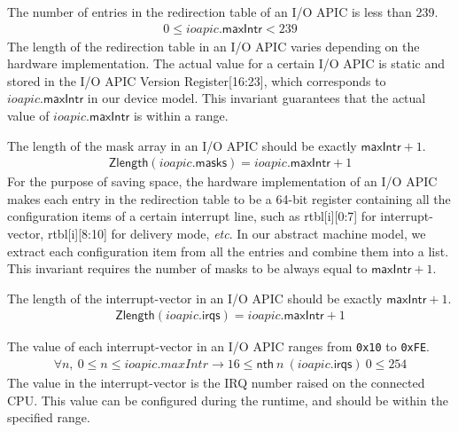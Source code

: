 \begin{invariant}
The number of entries in the redirection table of an I/O APIC is less than 239.
\begin{align*}
0 \leq ioapic.\textsf{maxIntr} < 239
\end{align*}
\noindent{}\textnormal{The length of the redirection table in an I/O APIC varies
	depending on the hardware implementation. The actual value for a certain I/O
	APIC is static and stored in the I/O APIC Version Register[16:23], which
	corresponds to $ioapic.\textsf{maxIntr}$ in our device model. This invariant
	guarantees that the actual value of $ioapic.\textsf{maxIntr}$ is within a range.
}
\end{invariant}

\begin{invariant}
	The length of the mask array in an I/O APIC should be exactly $\textsf{maxIntr} + 1$.
\begin{align*}
\textsf{Zlength} (ioapic.\textsf{masks}) = ioapic.\textsf{maxIntr} + 1
\end{align*}
\noindent\textnormal{For the purpose of saving space, the hardware
	implementation of an I/O APIC makes each entry in the redirection table to be a
	64-bit register containing all the configuration items of a certain interrupt
	line, such as rtbl[i][0:7] for interrupt-vector, rtbl[i][8:10] for delivery
	mode, {\it etc}. In our abstract machine model, we extract each configuration
	item from all the entries and combine them into a list. This invariant requires
	the number of masks to be always equal to $\textsf{maxIntr} + 1$.}
\end{invariant}

\begin{invariant}
	The length of the interrupt-vector in an I/O APIC should be exactly
$\textsf{maxIntr} + 1$.
\begin{align*}
\textsf{Zlength} (ioapic.\textsf{irqs}) = ioapic.\textsf{maxIntr} + 1
\end{align*}
\end{invariant}

\begin{invariant}
	The value of each interrupt-vector in an I/O APIC ranges from \texttt{0x10} to \texttt{0xFE}.
\begin{align*}
\forall n,~ 0 \le n \le ioapic.maxIntr \rightarrow 16 \leq \textsf{nth}~ n~ (ioapic.\textsf{irqs})~ 0 \leq 254
\end{align*}
\noindent\textnormal{The value in the interrupt-vector is the IRQ number raised
	on the connected CPU. This value can be configured during the runtime, and
	should be within the specified range.}
\end{invariant}


